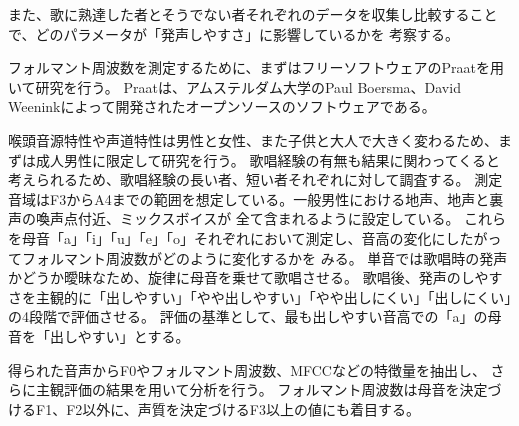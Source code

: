 \documentclass[12ptj,a4j,dvipdfmx,uplatex, titlepage]{jsarticle}
\begin{document}
また、歌に熟達した者とそうでない者それぞれのデータを収集し比較することで、どのパラメータが「発声しやすさ」に影響しているかを
考察する。

フォルマント周波数を測定するために、まずはフリーソフトウェアのPraatを用いて研究を行う\cite{praat}。
Praatは、アムステルダム大学のPaul Boersma、David Weeninkによって開発されたオープンソースのソフトウェアである。

喉頭音源特性や声道特性は男性と女性、また子供と大人で大きく変わるため、まずは成人男性に限定して研究を行う。
歌唱経験の有無も結果に関わってくると考えられるため、歌唱経験の長い者、短い者それぞれに対して調査する。
測定音域はF3からA4までの範囲を想定している。一般男性における地声、地声と裏声の喚声点付近、ミックスボイスが
全て含まれるように設定している。
これらを母音「a」「i」「u」「e」「o」それぞれにおいて測定し、音高の変化にしたがってフォルマント周波数がどのように変化するかを
みる。
単音では歌唱時の発声かどうか曖昧なため、旋律に母音を乗せて歌唱させる。
歌唱後、発声のしやすさを主観的に「出しやすい」「やや出しやすい」「やや出しにくい」「出しにくい」の4段階で評価させる。
評価の基準として、最も出しやすい音高での「a」の母音を「出しやすい」とする。

得られた音声からF0やフォルマント周波数、MFCCなどの特徴量を抽出し、
さらに主観評価の結果を用いて分析を行う。
フォルマント周波数は母音を決定づけるF1、F2以外に、声質を決定づけるF3以上の値にも着目する。


\end{document}
